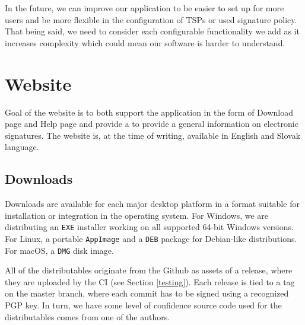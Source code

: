 \documentclass[thesismargins, english, thesislinespacing, onelinechapterstyle, upjsfrontpage]{rnthesis}
\begin{document}
In the future, we can improve our application to be easier to set up for more users and be more flexible in the configuration of TSPs or used signature policy.
That being said, we need to consider each configurable functionality we add as it increases complexity which could mean our software is harder to understand.

\section{Website}

Goal of the website is to both support the application in the form of Download page and Help page and provide a to provide a general information on electronic signatures.
The website is, at the time of writing, available in English and Slovak language.


\subsection{Downloads}

Downloads are available for each major desktop platform in a format suitable for installation or integration in the operating system.
For Windows, we are distributing an \texttt{EXE} installer working on all supported 64-bit Windows versions.
For Linux, a portable \texttt{AppImage} and a \texttt{DEB} package for Debian-like distributions.
For macOS, a \texttt{DMG} disk image.

All of the distributables originate from the Github as assets of a release, where they are uploaded by the CI (see Section \ref{testing}).
Each release is tied to a tag on the master branch, where each commit has to be signed using a recognized PGP key.
In turn, we have some level of confidence source code used for the distributables comes from one of the authors.
\end{document}
